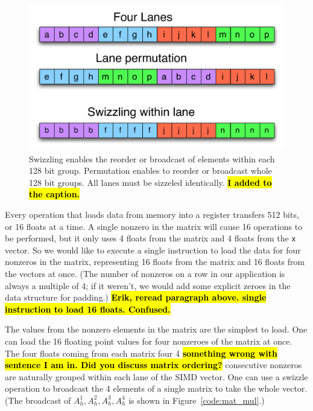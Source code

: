 \documentclass[10pt,conference,compsocconf]{IEEEtran}
\newcommand{\todo}[1]{{\color{red}\textbf{\hl{#1}}\xspace}}
\begin{document}
\begin{figure}
  \centering
  \includegraphics[width=\linewidth]{figures/swizzling_lanes.pdf}
  \caption{Swizzling enables the reorder or broadcast of elements within
    each 128 bit group. Permutation enables to reorder or broadcast
    whole 128 bit groups. All lanes must be sizzeled identically.
    \todo{I added to the caption.}}
  \label{fig:swizzling_permutation}
\end{figure}

Every operation that loads data from memory into a register
transfers 512 bits, or 16 floats at a time. A single nonzero
in the matrix will cause 16 operations to be performed, but it only
uses 4 floats from the matrix and 4 floats from the {\tt x} vector. So
we would like to execute a single instruction to load the data for four 
nonzeros in the matrix, representing 16 floats from the matrix and 16 floats from the vectors
at once. (The number of nonzeros on a row in our application is
always a multiple of 4; if it weren't, we would add some explicit
zeroes in the data structure for padding.)
\todo{Erik, reread paragraph above. single instruction to load 16 floats. Confused.}

The values from the nonzero elements in the matrix are the simplest to
load. One can load the 16 floating point values for four nonzeroes of
the matrix at once. The four floats coming from each matrix four 4
\todo{something wrong with sentence I am in. Did you discuss matrix ordering?}
consecutive nonzeros are naturally grouped within each lane of the
SIMD vector. One can use a swizzle operation to broadcast the 4
elements of a single matrix to take the whole vector. (The broadcast of 
$A_h^1,A_h^2,A_h^3,A_h^4$ is shown in Figure~\ref{code:mat_mul}.)
\end{document}
